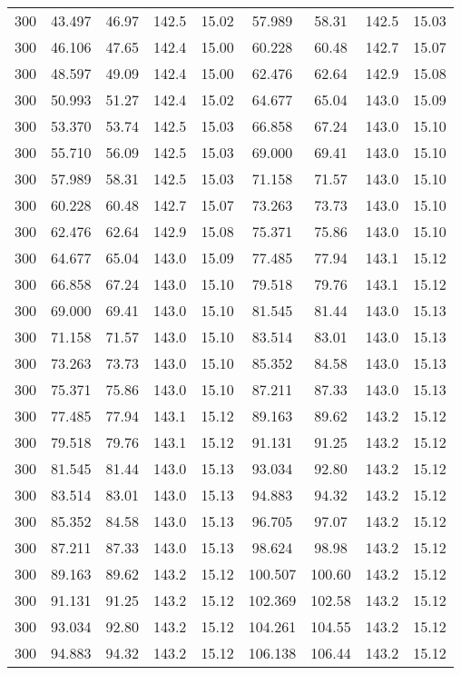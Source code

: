 \documentclass[
  captions=tableheading,
]{scrartcl}
\begin{document}
\begin{table}
\begin{tabular}{S[table-format=3.0] S[table-format=2.3] S S[table-format=3.1] S S[table-format=3.3] S[table-format=3.2] S[table-format=3.1] S}
     300 & 43.497  & 46.97  & 142.5 & 15.02 &  57.989 &  58.31 & 142.5 & 15.03 \\
     300 & 46.106  & 47.65  & 142.4 & 15.00 &  60.228 &  60.48 & 142.7 & 15.07 \\
     300 & 48.597  & 49.09  & 142.4 & 15.00 &  62.476 &  62.64 & 142.9 & 15.08 \\
     300 & 50.993  & 51.27  & 142.4 & 15.02 &  64.677 &  65.04 & 143.0 & 15.09 \\
     300 & 53.370  & 53.74  & 142.5 & 15.03 &  66.858 &  67.24 & 143.0 & 15.10 \\
     300 & 55.710  & 56.09  & 142.5 & 15.03 &  69.000 &  69.41 & 143.0 & 15.10 \\
     300 & 57.989  & 58.31  & 142.5 & 15.03 &  71.158 &  71.57 & 143.0 & 15.10 \\
     300 & 60.228  & 60.48  & 142.7 & 15.07 &  73.263 &  73.73 & 143.0 & 15.10 \\
     300 & 62.476  & 62.64  & 142.9 & 15.08 &  75.371 &  75.86 & 143.0 & 15.10 \\
     300 & 64.677  & 65.04  & 143.0 & 15.09 &  77.485 &  77.94 & 143.1 & 15.12 \\
     300 & 66.858  & 67.24  & 143.0 & 15.10 &  79.518 &  79.76 & 143.1 & 15.12 \\
     300 & 69.000  & 69.41  & 143.0 & 15.10 &  81.545 &  81.44 & 143.0 & 15.13 \\
     300 & 71.158  & 71.57  & 143.0 & 15.10 &  83.514 &  83.01 & 143.0 & 15.13 \\
     300 & 73.263  & 73.73  & 143.0 & 15.10 &  85.352 &  84.58 & 143.0 & 15.13 \\
     300 & 75.371  & 75.86  & 143.0 & 15.10 &  87.211 &  87.33 & 143.0 & 15.13 \\
     300 & 77.485  & 77.94  & 143.1 & 15.12 &  89.163 &  89.62 & 143.2 & 15.12 \\
     300 & 79.518  & 79.76  & 143.1 & 15.12 &  91.131 &  91.25 & 143.2 & 15.12 \\
     300 & 81.545  & 81.44  & 143.0 & 15.13 &  93.034 &  92.80 & 143.2 & 15.12 \\
     300 & 83.514  & 83.01  & 143.0 & 15.13 &  94.883 &  94.32 & 143.2 & 15.12 \\
     300 & 85.352  & 84.58  & 143.0 & 15.13 &  96.705 &  97.07 & 143.2 & 15.12 \\
     300 & 87.211  & 87.33  & 143.0 & 15.13 &  98.624 &  98.98 & 143.2 & 15.12 \\
     300 & 89.163  & 89.62  & 143.2 & 15.12 & 100.507 & 100.60 & 143.2 & 15.12 \\
     300 & 91.131  & 91.25  & 143.2 & 15.12 & 102.369 & 102.58 & 143.2 & 15.12 \\
     300 & 93.034  & 92.80  & 143.2 & 15.12 & 104.261 & 104.55 & 143.2 & 15.12 \\
     300 & 94.883  & 94.32  & 143.2 & 15.12 & 106.138 & 106.44 & 143.2 & 15.12 \\
    \bottomrule
  \end{tabular}
\end{table}
\end{document}

